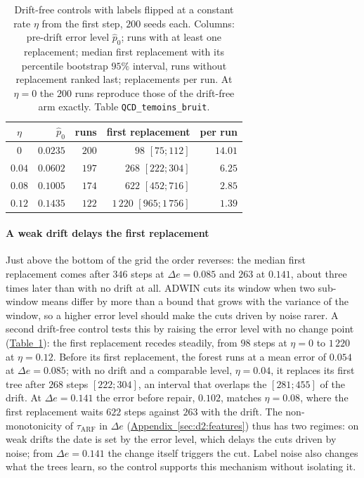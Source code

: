 \documentclass[10pt,conference]{IEEEtran}
\theoremstyle{definition}
\begin{document}
\begin{table}[t]
\centering
\caption{Drift-free controls with labels flipped at a constant rate $\eta$ from the first
step, $200$ seeds each. Columns: pre-drift error level $\hat p_0$; runs with at least one
replacement; median first replacement with its percentile bootstrap $95\%$ interval, runs
without replacement ranked last; replacements per run. At $\eta = 0$ the $200$ runs
reproduce those of the drift-free arm exactly. Table \texttt{QCD\_temoins\_bruit}.}
\label{tab:bruit}
\small
\begin{tabular}{crrrr}
\toprule
$\eta$ & $\hat p_0$ & runs & first replacement & per run \\
\midrule
$0$    & $0.0235$ & $200$ & $98$ $[75;112]$ & $14.01$ \\
$0.04$ & $0.0602$ & $197$ & $268$ $[222;304]$ & $6.25$ \\
$0.08$ & $0.1005$ & $174$ & $622$ $[452;716]$ & $2.85$ \\
$0.12$ & $0.1435$ & $122$ & $1\,220$ $[965;1\,756]$ & $1.39$ \\
\bottomrule
\end{tabular}
\end{table}

\paragraph{A weak drift delays the first replacement} Just above the bottom of the grid the
order reverses: the median first replacement comes after $346$ steps at $\Delta e = 0.085$
and $263$ at $0.141$, about three times later than with no drift at all. ADWIN cuts its
window when two sub-window means differ by more than a bound that grows with the variance
of the window, so a higher error level should make the cuts driven by noise rarer. A second
drift-free control tests this by raising the error level with no change point
(\hyperref[tab:bruit]{Table~\ref*{tab:bruit}}): the first replacement recedes steadily, from $98$ steps at
$\eta = 0$ to $1\,220$ at $\eta = 0.12$. Before its first replacement, the forest runs at a
mean error of $0.054$ at $\Delta e = 0.085$; with no drift and a comparable level,
$\eta = 0.04$, it replaces its first tree after $268$ steps $[222;304]$, an interval that
overlaps the $[281;455]$ of the drift. At $\Delta e = 0.141$ the error before repair,
$0.102$, matches $\eta = 0.08$, where the first replacement waits $622$ steps against $263$
with the drift. The non-monotonicity of $\tau_{\mathrm{ARF}}$ in $\Delta e$
(\hyperref[sec:d2:features]{Appendix~\ref*{sec:d2:features}}) thus has two regimes: on weak drifts the date is set by the
error level, which delays the cuts driven by noise; from $\Delta e = 0.141$ the change itself
triggers the cut. Label noise also changes what the trees learn, so the control supports
this mechanism without isolating it.
\end{document}
